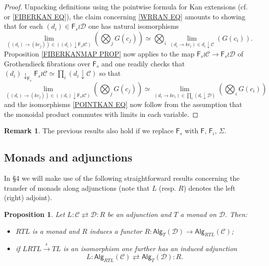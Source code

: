 \documentclass[a4paper,10pt
,draft
]{article}%
\numberwithin{equation}{section}
\numberwithin{figure}{section}
\newtheorem{proposition}[equation]{Proposition}%
\theoremstyle{definition} %
\newtheorem{remark}[equation]{Remark}%
\newcommand{\Fin}{\mathsf{F}}%
\newcommand{\C}{\ensuremath{\mathcal C}}
\newcommand{\1}{\ensuremath{\mathbbm 1}}%
\begin{document}
\begin{proof}
	Unpacking definitions using the pointwise formula for Kan extensions (cf. \cite[X.3 Thm. 1]{McL} or \eqref{FIBERKAN EQ}), the claim concerning \eqref{WRRAN EQ} amounts to showing that for each $(d_i) \in \Fin_s \wr \mathcal{D}$ one has natural isomorphisms
	\begin{equation}\label{POINTKAN EQ}
	\underset{((d_i) \to (kc_j))\in
	\left( (d_i) \downarrow \Fin_s \wr \C \right) }{\lim} {\left(\bigotimes_j{G(c_j)}\right)}
		\simeq	
	\bigotimes_i \underset{(d_i  \to kc_i) \in d_i \downarrow \C}{\lim}
	\left(G(c_i)\right).
	\end{equation}
Proposition \ref{FIBERKANMAP PROP} now applies to 
the map $\Fin_s \wr \mathcal{C} \to \Fin_s \wr \mathcal{D}$ of Grothendieck fibrations over $\Fin_s$ and one readily checks that
$(d_i)\downarrow_{\Fin_s} \Fin_s \wr \mathcal{C} \simeq
\prod_{i}{(d_i\downarrow \mathcal{C})}
$
so that 
	\[
	\underset{((d_i) \to (kc_j))\in
	\left( (d_i)\downarrow \Fin_s \wr \C \right) }{\lim} {\left(\bigotimes_j{G(c_j)}\right)}
		\simeq	
	\underset{(d_i \to kc_i)\in
	\prod_{i} \left( {d_i \downarrow \mathcal{D}} \right)}{\lim}
	\left(\bigotimes_i{G(c_i)}\right)
	\]
and the isomorphisms \eqref{POINTKAN EQ} now follow from the assumption that the monoidal product commutes with limits in each variable.
\end{proof}

\begin{remark}
      The previous results also hold if we replace $\Fin_s$ with $\Fin$, $\Fin_i$, $\Sigma$.
\end{remark}

\subsection{Monads and adjunctions}


In \S 4 we will make use of the following straightforward results concerning the transfer of monads along adjunctions
(note that $L$ (resp. $R$) denotes the left (right) adjoint).


\begin{proposition}\label{MONADADJ1 PROP}
Let
$
L \colon \mathcal{C} \rightleftarrows \mathcal{D} \colon R
$
be an adjunction and $T$ a monad on $\mathcal{D}$.
Then:
\begin{itemize}
\item[(i)] $RTL$ is a monad and $R$ induces a functor
$R \colon \mathsf{Alg}_T(\mathcal{D}) \to \mathsf{Alg}_{RTL}(\mathcal{C})$;
\item[(ii)] if $LRTL \xrightarrow{\epsilon} TL$ is an isomorphism one further has an induced adjunction
\[
L \colon \mathsf{Alg}_{RTL}(\mathcal{C})
	\rightleftarrows
\mathsf{Alg}_{T}(\mathcal{D}) \colon R.
\]
\end{itemize}
\end{proposition}
\end{document}

